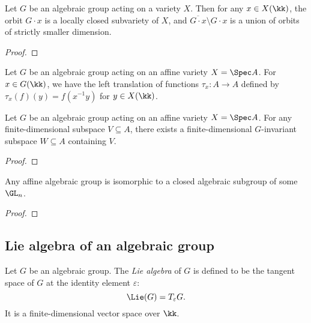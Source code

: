     \begin{proposition}\label{prop:orbit_is_locally_closed}
        Let \(G\) be an algebraic group acting on a variety \(X\).
        Then for any \(x \in X(\kk)\), the orbit \(G \cdot x\) is a locally closed subvariety of \(X\), and \(\overline{G \cdot x} \setminus G \cdot x \) is a union of orbits of strictly smaller dimension.
    \end{proposition}
    \begin{proof}
    \end{proof}

    Let \(G\) be an algebraic group acting on an affine variety \(X = \Spec A\).
    For \(x \in G(\kk)\), we have the left translation of functions \(\tau_x: A \to A\) defined by \(\tau_x(f)(y) = f(x^{-1}y)\) for \(y \in X(\kk)\).

    \begin{lemma}\label{lem:finite_dimensional_invariant_subspace}
        Let \(G\) be an algebraic group acting on an affine variety \(X = \Spec A\).
        For any finite-dimensional subspace \(V \subseteq A\), there exists a finite-dimensional \(G\)-invariant subspace \(W \subseteq A\) containing \(V\).
    \end{lemma}
    \begin{proof}
    \end{proof}

    \begin{theorem}\label{thm:affine_algebraic_group_is_linear}
        Any affine algebraic group is isomorphic to a closed algebraic subgroup of some \(\GL_n\).
    \end{theorem}
    \begin{proof}
    \end{proof}




\subsection{Lie algebra of an algebraic group}

    Let \(G\) be an algebraic group.
    The \emph{Lie algebra} of \(G\) is defined to be the tangent space of \(G\) at the identity element \(\varepsilon\):
    \[
        \Lie(G) = T_\varepsilon G.
    \]
    It is a finite-dimensional vector space over \(\kk\).

